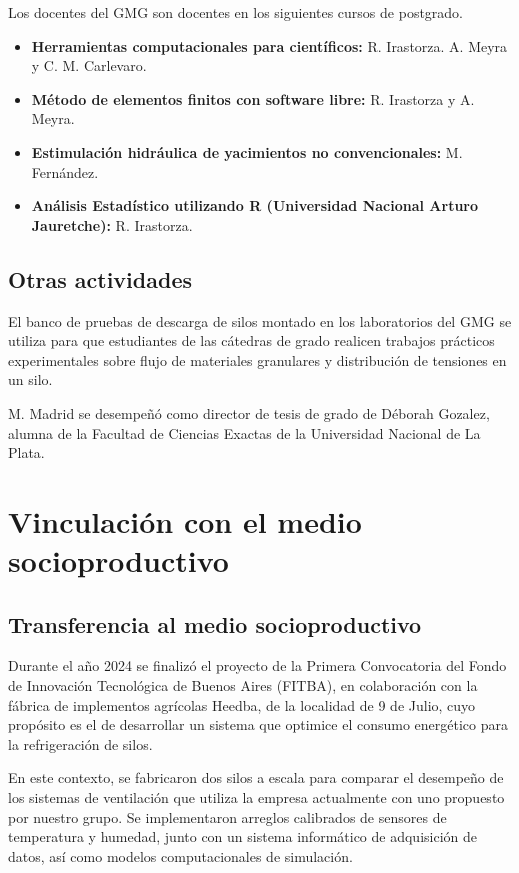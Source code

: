 \documentclass[a4paper,11pt,twoside,final,titlepage,onecolumn,openright]{report}
\begin{document}
Los docentes del GMG son docentes en los siguientes cursos de postgrado.

\begin{itemize}
 \item {\bf Herramientas computacionales para científicos:} R. Irastorza. A. Meyra y C. M. Carlevaro.
 \item \textbf{Método de elementos finitos con software libre:} R. Irastorza y A. Meyra.
 \item \textbf{Estimulación hidráulica de yacimientos no convencionales:} M. Fernández.
 \item {\bf Análisis Estadístico utilizando R (Universidad Nacional Arturo Jauretche):} R. Irastorza.
\end{itemize}

\section{Otras actividades}

El banco de pruebas de descarga de silos montado en los laboratorios del GMG se utiliza para que estudiantes de las cátedras de grado realicen trabajos prácticos experimentales sobre flujo de materiales granulares y distribución de tensiones en un silo. 

M. Madrid se desempeñó como director de tesis de grado de Déborah Gozalez, alumna de la Facultad de Ciencias Exactas de la Universidad Nacional de La Plata.

\chapter{Vinculación con el medio socioproductivo}

\section{Transferencia al medio socioproductivo}

Durante el año 2024 se finalizó el proyecto de la Primera Convocatoria del Fondo de Innovación Tecnológica de Buenos Aires (FITBA), en colaboración con la fábrica de implementos agrícolas Heedba, de la localidad de 9 de Julio, cuyo propósito es el de desarrollar un sistema que optimice el consumo energético para la refrigeración de silos. 

En este contexto, se fabricaron dos silos a escala para comparar el desempeño de los sistemas de ventilación que utiliza la empresa actualmente con uno propuesto por nuestro grupo. Se implementaron arreglos calibrados de sensores de temperatura y humedad, junto con un sistema informático de adquisición de datos, así como modelos computacionales de simulación. 
\end{document}
